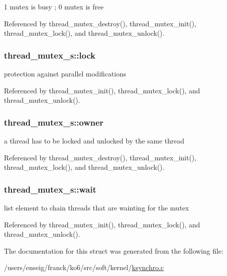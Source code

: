 1 mutex is busy ; 0 mutex is free 



Referenced by thread\-\_\-mutex\-\_\-destroy(), thread\-\_\-mutex\-\_\-init(), thread\-\_\-mutex\-\_\-lock(), and thread\-\_\-mutex\-\_\-unlock().

\hypertarget{structthread__mutex__s_a541c29b3f7adb7366d0fa924fe212045}{
\subsubsection[{lock}]{ thread\-\_\-mutex\-\_\-s\-::lock}}\label{structthread__mutex__s_a541c29b3f7adb7366d0fa924fe212045}


protection against parallel modifications 



Referenced by thread\-\_\-mutex\-\_\-init(), thread\-\_\-mutex\-\_\-lock(), and thread\-\_\-mutex\-\_\-unlock().

\hypertarget{structthread__mutex__s_aebfefcc73771f614b7f19296a46e2b04}{
\subsubsection[{owner}]{ thread\-\_\-mutex\-\_\-s\-::owner}}\label{structthread__mutex__s_aebfefcc73771f614b7f19296a46e2b04}


a thread has to be locked and unlocked by the same thread 



Referenced by thread\-\_\-mutex\-\_\-destroy(), thread\-\_\-mutex\-\_\-init(), thread\-\_\-mutex\-\_\-lock(), and thread\-\_\-mutex\-\_\-unlock().

\hypertarget{structthread__mutex__s_ad48ae2f605a85e11fa31e11c78cb726c}{
\subsubsection[{wait}]{ thread\-\_\-mutex\-\_\-s\-::wait}}\label{structthread__mutex__s_ad48ae2f605a85e11fa31e11c78cb726c}


list element to chain threads that are wainting for the mutex 



Referenced by thread\-\_\-mutex\-\_\-init(), thread\-\_\-mutex\-\_\-lock(), and thread\-\_\-mutex\-\_\-unlock().



The documentation for this struct was generated from the following file\-:\begin{DoxyCompactItemize}
\item 
/users/enseig/franck/ko6/src/soft/kernel/\hyperlink{ksynchro_8c}{ksynchro.\-c}\end{DoxyCompactItemize}
